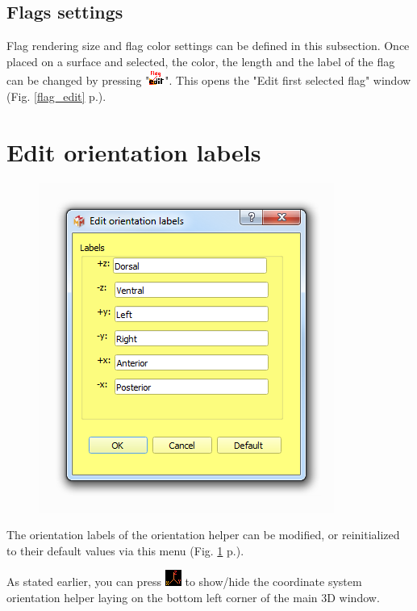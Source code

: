 \subsection{Flags settings}
Flag rendering size and flag color settings can be defined in this subsection. Once placed on a surface and selected, the color, the length and the label of the flag can be changed by pressing "\includegraphics[scale=0.7]{images/06/objects/flag_edit.png}". This opens the "Edit first selected flag" window (Fig. \ref{flag_edit} p.\pageref{flag_edit}).




\section{Edit orientation labels}
\begin{figure}
  \centering  
 \includegraphics[scale=0.5]{images/08/orientation_labels.png}
\label{orientation_labels}
\end{figure}
The orientation labels of the orientation helper can be modified, or reinitialized to their default values via this menu (Fig. \ref{orientation_labels} p.\pageref{orientation_labels}).

As stated earlier, you can press \includegraphics[scale=0.7]{images/06/display/orientation_helper.png} to show/hide the coordinate system orientation helper laying on the bottom left corner of the main 3D window.


